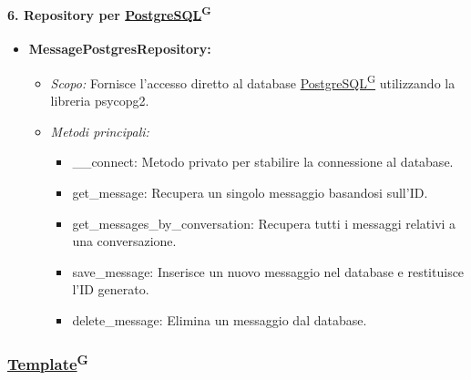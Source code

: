     \paragraph{6. Repository per \href{https://code7crusaders.github.io/docs/PB/documentazione_interna/glossario.html#postgresql}{PostgreSQL}\textsuperscript{G}}
    \begin{itemize}
        \item \textbf{MessagePostgresRepository:}
        \begin{itemize}
            \item \textit{Scopo:} Fornisce l’accesso diretto al database \href{https://code7crusaders.github.io/docs/PB/documentazione_interna/glossario.html#postgresql}{PostgreSQL\textsuperscript{G}} utilizzando la libreria psycopg2.
            \item \textit{Metodi principali:}
            \begin{itemize}
                \item \_\_connect: Metodo privato per stabilire la connessione al database.
                \item get\_message: Recupera un singolo messaggio basandosi sull’ID.
                \item get\_messages\_by\_conversation: Recupera tutti i messaggi relativi a una conversazione.
                \item save\_message: Inserisce un nuovo messaggio nel database e restituisce l’ID generato.
                \item delete\_message: Elimina un messaggio dal database.
            \end{itemize}
        \end{itemize}
    \end{itemize}

    \subsubsection{\href{https://code7crusaders.github.io/docs/PB/documentazione_interna/glossario.html#template}{Template}\textsuperscript{G}}

